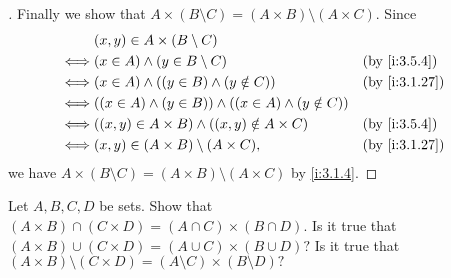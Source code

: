 \begin{proof}[]
  Finally we show that \(A \times (B \setminus C) = (A \times B) \setminus (A \times C)\).
  Since
  \begin{align*}
         & (x, y) \in A \times (B \setminus C)                                                 \\
    \iff & (x \in A) \land (y \in B \setminus C)                            &  & \by{i:3.5.4}  \\
    \iff & (x \in A) \land ((y \in B) \land (y \notin C))                   &  & \by{i:3.1.27} \\
    \iff & ((x \in A) \land (y \in B)) \land ((x \in A) \land (y \notin C))                    \\
    \iff & ((x, y) \in A \times B) \land ((x, y) \notin A \times C)         &  & \by{i:3.5.4}  \\
    \iff & (x, y) \in (A \times B) \setminus (A \times C),                  &  & \by{i:3.1.27}
  \end{align*}
  we have \(A \times (B \setminus C) = (A \times B) \setminus (A \times C)\) by \cref{i:3.1.4}.
\end{proof}

\begin{ex}\label{i:ex:3.5.5}
  Let \(A, B, C, D\) be sets.
  Show that \((A \times B) \cap (C \times D) = (A \cap C) \times (B \cap D)\).
  Is it true that \((A \times B) \cup (C \times D) = (A \cup C) \times (B \cup D)?\)
  Is it true that \((A \times B) \setminus (C \times D) = (A \setminus C) \times (B \setminus D)?\)
\end{ex}

